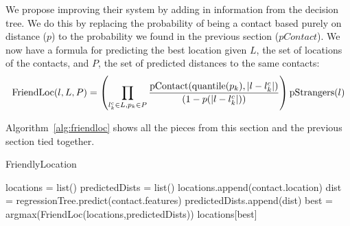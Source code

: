 We propose improving their system by adding in information from the decision
tree.
%
We do this by replacing the probability of being a contact based purely on
distance ($p$) to the probability we found in the previous section
($pContact$).
%
We now have a formula for predicting the best location given $L$, the set of
locations of the contacts, and $P$, the set of predicted distances to the same
contacts:
\[
    \operatorname{FriendLoc}(l,L,P) =
        \left(
            \prod_{l^c_k \in L,p_k \in P}
            {\operatorname{pContact}(\operatorname{quantile}(p_k),|l-l^c_k|) \over (1-p(|l-l^c_k|))}
        \right)
        \operatorname{pStrangers}(l)
\]

Algorithm~\ref{alg:friendloc} shows all the pieces from this section and the
previous section tied together.

\begin{algorithm}
  \caption{FriendlyLocation \label{alg:friendloc}}
  \begin{algorithmic}[0]
  \State locations = list()
  \State predictedDists = list()
        \State \Continue
      \EndIf
      \State locations.append(contact.location)
      \State dist = regressionTree.predict(contact.features)
      \State predictedDists.append(dist)
  \EndFor
  \State best = argmax(FriendLoc(locations,predictedDists))
  \State \Return locations[best]
  \end{algorithmic}
\end{algorithm}


